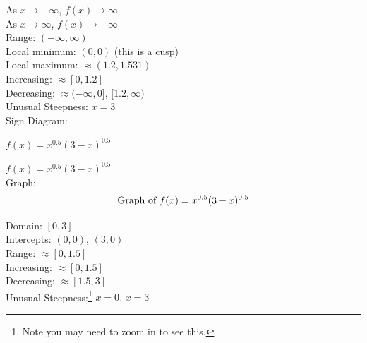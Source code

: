 \documentclass{ximera}
\begin{document}
\begin{question}
\begin{problem}
\begin{solution}
As $x \rightarrow -\infty$, $f(x) \rightarrow \infty$\\
As $x \rightarrow \infty$, $f(x) \rightarrow -\infty$\\
Range: $(-\infty, \infty)$\\
Local minimum: $(0,0)$ (this is a cusp)\\
Local maximum: $\approx (1.2, 1.531)$\\
Increasing: $\approx [0, 1.2]$ \\
Decreasing: $\approx (-\infty, 0]$, $[1.2, \infty)$\\
Unusual Steepness:  $x = 3$\\
Sign Diagram:\\
\begin{image}
\end{image}
\end{solution}
\end{problem}

\begin{problem} $f(x) = x^{0.5} (3-x)^{0.5}$

\begin{solution}
$f(x) = x^{0.5}(3-x)^{0.5}$ \\
Graph: \\
$$\text{Graph of $f(x) = x^{0.5}(3-x)^{0.5}$}$$

Domain: $[0,3]$\\
Intercepts: $(0,0)$, $(3,0)$\\
Range: $\approx [0, 1.5]$\\
Increasing: $\approx [0, 1.5]$ \\
Decreasing: $\approx [1.5, 3]$\\
Unusual Steepness:\footnote{Note you may need to zoom in to see this.}  $x=0$, $x = 3$\\
\begin{image}
\end{image}
\end{solution}
\end{problem}


\end{question}
\end{document}

